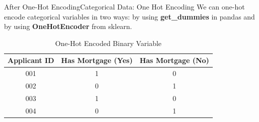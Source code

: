 \documentclass[11pt]{beamer}
\begin{document}
%
\begin{frame}{After One-Hot Encoding}{Categorical Data: One Hot Encoding}
We can one-hot encode categorical variables in two ways: by using \textbf{get\_dummies} in pandas and by using \textbf{OneHotEncoder} from sklearn.
    \begin{table}[]
        \centering
        \renewcommand{\arraystretch}{1.5} %
        \begin{tabular}{|c|c|c|}
            \hline
            \rule{0pt}{15pt} %
            \textbf{Applicant ID} & \textbf{Has Mortgage (Yes)} & \textbf{Has Mortgage (No)} \\
            \hline
            001 & 1 & 0 \\
            002 & 0 & 1 \\
            003 & 1 & 0 \\
            004 & 0 & 1 \\
            \hline
        \end{tabular}
        \caption{One-Hot Encoded Binary Variable}
    \end{table}
\end{frame}
%
%
\end{document}
